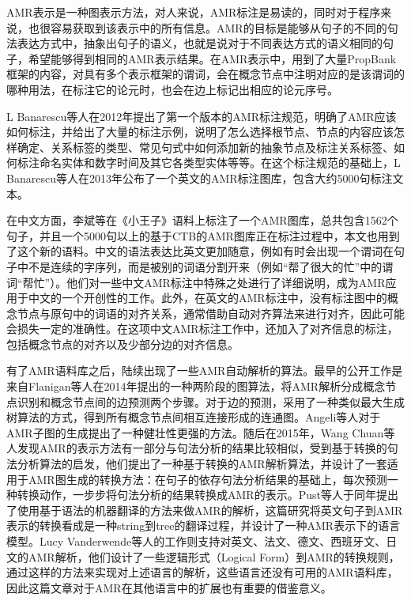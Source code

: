 \documentclass[master, winfont]{njuthesis}
\begin{document}
AMR表示是一种图表示方法\cite{Banarescu2013Abstract}，对人来说，AMR标注是易读的，同时对于程序来说，也很容易获取到该表示中的所有信息。AMR的目标是能够从句子的不同的句法表达方式中，抽象出句子的语义，也就是说对于不同表达方式的语义相同的句子，希望能够得到相同的AMR表示结果。在AMR表示中，用到了大量PropBank框架的内容，对具有多个表示框架的谓词，会在概念节点中注明对应的是该谓词的哪种用法，在标注它的论元时，也会在边上标记出相应的论元序号。

L Banarescu等人\cite{banarescu2012abstract}在2012年提出了第一个版本的AMR标注规范，明确了AMR应该如何标注，并给出了大量的标注示例，说明了怎么选择根节点、节点的内容应该怎样确定、关系标签的类型、常见句式中如何添加新的抽象节点及标注关系标签、如何标注命名实体和数字时间及其它各类型实体等等。在这个标注规范的基础上，L Banarescu等人\cite{Banarescu2013Abstract}在2013年公布了一个英文的AMR标注图库，包含大约5000句标注文本。

在中文方面，李斌等\cite{Li2016Annotating}在《小王子》语料上标注了一个AMR图库，总共包含1562个句子，并且一个5000句以上的基于CTB的AMR图库正在标注过程中，本文也用到了这个新的语料。中文的语法表达比英文更加随意，例如有时会出现一个谓词在句子中不是连续的字序列，而是被别的词语分割开来（例如“帮了很大的忙”中的谓词“帮忙”）。他们对一些中文AMR标注中特殊之处进行了详细说明，成为AMR应用于中文的一个开创性的工作。此外，在英文的AMR标注中，没有标注图中的概念节点与原句中的词语的对齐关系，通常借助自动对齐算法来进行对齐，因此可能会损失一定的准确性。在这项中文AMR标注工作中，还加入了对齐信息的标注，包括概念节点的对齐以及少部分边的对齐信息。

有了AMR语料库之后，陆续出现了一些AMR自动解析的算法。最早的公开工作是来自Flanigan等人\cite{Flanigan2014}在2014年提出的一种两阶段的图算法，将AMR解析分成概念节点识别和概念节点间的边预测两个步骤。对于边的预测，采用了一种类似最大生成树算法的方式，得到所有概念节点间相互连接形成的连通图。Angeli等人\cite{Angeli2014}对于AMR子图的生成提出了一种健壮性更强的方法。随后在2015年，Wang Chuan\cite{Wang2015}等人发现AMR的表示方法有一部分与句法分析的结果比较相似，受到基于转换的句法分析算法的启发，他们提出了一种基于转换的AMR解析算法，并设计了一套适用于AMR图生成的转换方法：在句子的依存句法分析结果的基础上，每次预测一种转换动作，一步步将句法分析的结果转换成AMR的表示。Pust等人\cite{Pust2015}于同年提出了使用基于语法的机器翻译的方法来做AMR的解析，这篇研究将英文句子到AMR表示的转换看成是一种string到tree的翻译过程，并设计了一种AMR表示下的语言模型。Lucy Vanderwende等人\cite{Vanderwende2015}的工作则支持对英文、法文、德文、西班牙文、日文的AMR解析，他们设计了一些逻辑形式（Logical Form）到AMR的转换规则，通过这样的方法来实现对上述语言的解析，这些语言还没有可用的AMR语料库，因此这篇文章对于AMR在其他语言中的扩展也有重要的借鉴意义。
\end{document}
